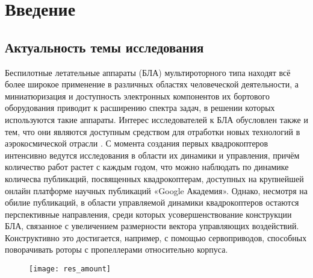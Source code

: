 
\chapter{Введение}

\section{Актуальность темы исследования}

Беспилотные летательные аппараты (БЛА) мультироторного типа находят всё более широкое применение в различных областях человеческой деятельности, а миниатюризация и доступность электронных компонентов их бортового оборудования приводит к расширению спектра задач, в решении которых используются такие аппараты.
Интерес исследователей к БЛА обусловлен также и тем, что они являются доступным средством для отработки новых технологий в аэрокосмической отрасли \cite{Otero01}.
С момента создания первых квадрокоптеров интенсивно ведутся исследования в области их динамики и управления, причём количество работ растет с каждым годом, что можно наблюдать по динамике количесва публикаций, посвященных квадрокоптерам, доступных на крупнейшей онлайн платформе научных публикаций «Google Академия».
Однако, несмотря на обилие публикаций, в области управляемой динамики квадрокоптеров остаются перспективные направления, среди которых усовершенствование конструкции БЛА, связанное с увеличением размерности вектора управляющих воздействий.
Конструктивно это достигается, например, с помощью сервоприводов, способных поворачивать роторы с пропеллерами относительно корпуса.
\begin{figure}[h!]
	\centering
	\texttt{[image: res\_amount]}
	\label{res_amount}
\end{figure}

